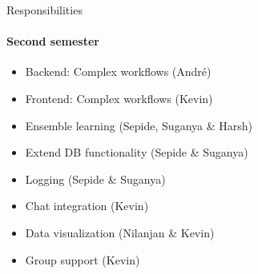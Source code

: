 \begin{frame}{Responsibilities}
\framesubtitle{Second semester}
	\begin{itemize}
		\item Backend: Complex workflows (André)
		\item Frontend: Complex workflows (Kevin)
		\item Ensemble learning  (Sepide, Suganya \& Harsh)
		\item Extend DB functionality (Sepide \& Suganya)
		\item Logging (Sepide \& Suganya)
		\item Chat integration (Kevin)
		\item Data visualization (Nilanjan \& Kevin)
		\item Group support (Kevin)
	\end{itemize}
\end{frame}